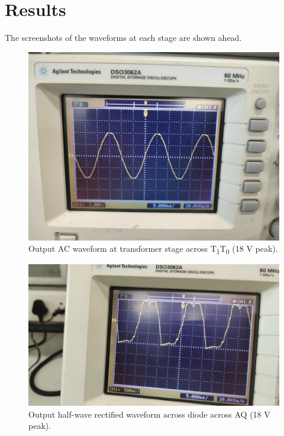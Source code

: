 \documentclass[journal,12pt,twocolumn]{IEEEtran}
\begin{document}
\section{Results}
The screenshots of the waveforms at each stage are shown ahead.

\begin{figure}[!ht]
    \includegraphics[width=\columnwidth]{figs/figure1.jpg}
    \caption{Output AC waveform at transformer stage across T\textsubscript{1}T\textsubscript{0} (18 V peak).}
    \label{fig:transformer}
\end{figure}

\begin{figure}[!ht]
    \includegraphics[width=\columnwidth]{figs/figure2.jpg}
    \caption{Output half-wave rectified waveform across diode across AQ (18 V peak).}
    \label{fig:rectifier}
\end{figure}
\end{document}
